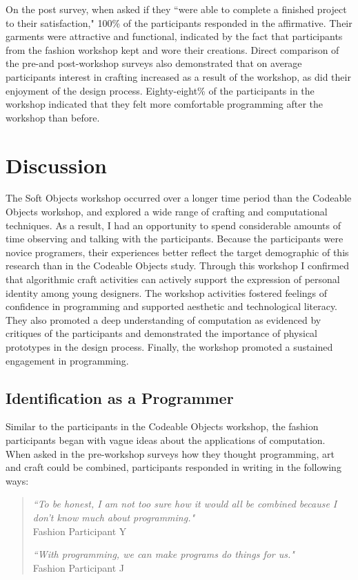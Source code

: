 On the post survey, when asked if they ``were able to complete a finished project to their satisfaction," 100\% of the participants responded in the affirmative. Their garments were attractive and functional, indicated by the fact that participants from the fashion workshop kept and wore their creations. Direct comparison of the pre-and post-workshop surveys also demonstrated that on average participants interest in crafting increased as a result of the workshop, as did their enjoyment of the design process. Eighty-eight\% of the participants in the workshop indicated that they felt more comfortable programming after the workshop than before.

\section{Discussion}
The Soft Objects workshop occurred over a longer time period than the Codeable Objects workshop, and explored a wide range of crafting and computational techniques. As a result, I had an opportunity to spend considerable amounts of time observing and talking with the participants. Because the participants were novice programers, their experiences better reflect the target demographic of this research than in the Codeable Objects study. Through this workshop I confirmed that algorithmic craft activities can actively support the expression of personal identity among young designers. The workshop activities fostered feelings of confidence in programming and supported aesthetic and technological literacy. They also promoted a deep understanding of computation as evidenced by critiques of the participants and demonstrated the importance of physical prototypes in the design process. Finally, the workshop promoted a sustained engagement in programming.

 
\subsection{Identification as a Programmer}
Similar to the participants in the Codeable Objects workshop, the fashion participants began with vague ideas about the applications of computation. When asked in the pre-workshop surveys how they thought programming, art and craft could be combined, participants responded in writing in the following ways:
\begin{quotation}
\textit{``To be honest, I am not too sure how it would all be combined because I don't know much about programming."} 
\\Fashion Participant Y

\textit{``With programming, we can make programs do things for us."}
\\Fashion Participant J
\end{quotation}

